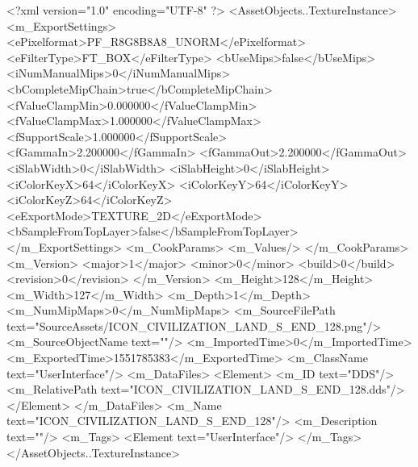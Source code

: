 <?xml version="1.0" encoding="UTF-8" ?>
<AssetObjects..TextureInstance>
	<m_ExportSettings>
		<ePixelformat>PF_R8G8B8A8_UNORM</ePixelformat>
		<eFilterType>FT_BOX</eFilterType>
		<bUseMips>false</bUseMips>
		<iNumManualMips>0</iNumManualMips>
		<bCompleteMipChain>true</bCompleteMipChain>
		<fValueClampMin>0.000000</fValueClampMin>
		<fValueClampMax>1.000000</fValueClampMax>
		<fSupportScale>1.000000</fSupportScale>
		<fGammaIn>2.200000</fGammaIn>
		<fGammaOut>2.200000</fGammaOut>
		<iSlabWidth>0</iSlabWidth>
		<iSlabHeight>0</iSlabHeight>
		<iColorKeyX>64</iColorKeyX>
		<iColorKeyY>64</iColorKeyY>
		<iColorKeyZ>64</iColorKeyZ>
		<eExportMode>TEXTURE_2D</eExportMode>
		<bSampleFromTopLayer>false</bSampleFromTopLayer>
	</m_ExportSettings>
	<m_CookParams>
		<m_Values/>
	</m_CookParams>
	<m_Version>
		<major>1</major>
		<minor>0</minor>
		<build>0</build>
		<revision>0</revision>
	</m_Version>
	<m_Height>128</m_Height>
	<m_Width>127</m_Width>
	<m_Depth>1</m_Depth>
	<m_NumMipMaps>0</m_NumMipMaps>
	<m_SourceFilePath text="SourceAssets/ICON_CIVILIZATION_LAND_S_END_128.png"/>
	<m_SourceObjectName text=""/>
	<m_ImportedTime>0</m_ImportedTime>
	<m_ExportedTime>1551785383</m_ExportedTime>
	<m_ClassName text="UserInterface"/>
	<m_DataFiles>
		<Element>
			<m_ID text="DDS"/>
			<m_RelativePath text="ICON_CIVILIZATION_LAND_S_END_128.dds"/>
		</Element>
	</m_DataFiles>
	<m_Name text="ICON_CIVILIZATION_LAND_S_END_128"/>
	<m_Description text=""/>
	<m_Tags>
		<Element text="UserInterface"/>
	</m_Tags>
</AssetObjects..TextureInstance>

